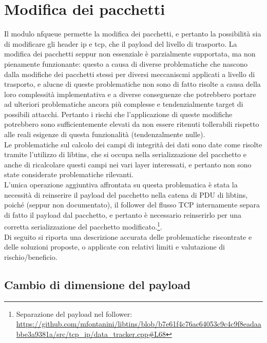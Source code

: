 \section{Modifica dei pacchetti}

Il modulo nfqueue permette la modifica dei pacchetti, e pertanto la possibilità sia di modificare gli header ip e tcp, che il payload del livello di trasporto.
La modifica dei pacchetti seppur non essenziale è parzialmente supportata, ma non pienamente funzionante: questo a causa di diverse problematiche che nascono
dalla modifiche dei pacchetti stessi per diversi meccaniscmi applicati a livello di trasporto, e alucne di queste problematiche non sono di fatto
risolte a causa della loro complessità implementativa e a diverse conseguenze che potrebbero portare ad ulteriori problematiche ancora più complesse e tendenzialmente target di possibili attacchi.
Pertanto i rischi che l'applicazione di queste modifiche potrebbero sono sufficientemente elevati da non essere ritenuti tollerabili rispetto alle reali esigenze di questa funzionalità (tendenzalmente nulle).\\

Le problematiche sul calcolo dei campi di integrità dei dati sono date come risolte tramite l'utilizzo di libtins, che si occupa nella serializzazione del pacchetto e
anche di ricalcolare questi campi nei vari layer interessati, e pertanto non sono state considerate problematiche rilevanti.\\

L'unica operazione aggiuntiva affrontata su questa problematica è stata la necessità di reinserire il payload del pacchetto nella catena di PDU di libtins,
poiché (seppur non documentato), il follower del flusso TCP internamente separa di fatto il payload dal pacchetto, e pertanto è necessario reinserirlo per una
corretta serializzazione del pacchetto modificato.\footnote{Separazione del payload nel follower: \url{https://github.com/mfontanini/libtins/blob/b7e61f4c76ac64053c9c4c9f8eadaabbe3a9381a/src/tcp_ip/data_tracker.cpp\#L68}}.\\

Di seguito si riporta una descrizione accurata delle problematiche riscontrate e delle soluzioni proposte, o applicate con relativi limiti e valutazione di rischio/beneficio.\\

\subsection{Cambio di dimensione del payload}

